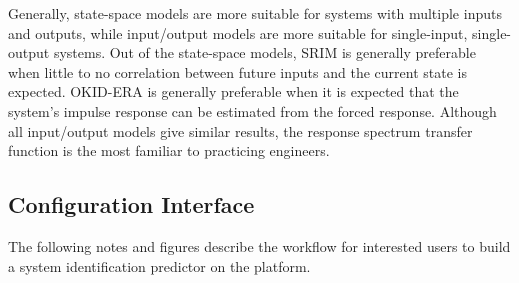Generally, state-space models are more suitable for systems with multiple inputs and outputs, while input/output models are more suitable for single-input, single-output systems. Out of the state-space models, SRIM is generally preferable when little to no correlation between future inputs and the current state is expected. OKID-ERA is generally preferable when it is expected that the system's impulse response can be estimated from the forced response. Although all input/output models give similar results, the response spectrum transfer function is the most familiar to practicing engineers.


\subsection{Configuration Interface}

The following notes and figures describe the workflow for interested users to build a system identification predictor on the \BRACE{} platform.

